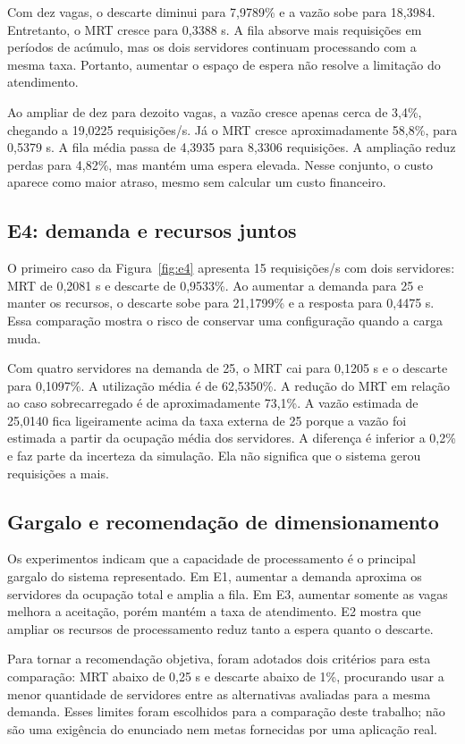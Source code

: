 \documentclass[10pt]{ieeeconf}
\begin{document}
Com dez vagas, o descarte diminui para 7,9789\% e a vazão sobe para 18,3984. Entretanto, o MRT cresce para 0,3388 s. A fila absorve mais requisições em períodos de acúmulo, mas os dois servidores continuam processando com a mesma taxa. Portanto, aumentar o espaço de espera não resolve a limitação do atendimento.

Ao ampliar de dez para dezoito vagas, a vazão cresce apenas cerca de 3,4\%, chegando a 19,0225 requisições/s. Já o MRT cresce aproximadamente 58,8\%, para 0,5379 s. A fila média passa de 4,3935 para 8,3306 requisições. A ampliação reduz perdas para 4,82\%, mas mantém uma espera elevada. Nesse conjunto, o custo aparece como maior atraso, mesmo sem calcular um custo financeiro.

\subsection{E4: demanda e recursos juntos}
O primeiro caso da Figura~\ref{fig:e4} apresenta 15 requisições/s com dois servidores: MRT de 0,2081 s e descarte de 0,9533\%. Ao aumentar a demanda para 25 e manter os recursos, o descarte sobe para 21,1799\% e a resposta para 0,4475 s. Essa comparação mostra o risco de conservar uma configuração quando a carga muda.

Com quatro servidores na demanda de 25, o MRT cai para 0,1205 s e o descarte para 0,1097\%. A utilização média é de 62,5350\%. A redução do MRT em relação ao caso sobrecarregado é de aproximadamente 73,1\%. A vazão estimada de 25,0140 fica ligeiramente acima da taxa externa de 25 porque a vazão foi estimada a partir da ocupação média dos servidores. A diferença é inferior a 0,2\% e faz parte da incerteza da simulação. Ela não significa que o sistema gerou requisições a mais.

\subsection{Gargalo e recomendação de dimensionamento}
Os experimentos indicam que a capacidade de processamento é o principal gargalo do sistema representado. Em E1, aumentar a demanda aproxima os servidores da ocupação total e amplia a fila. Em E3, aumentar somente as vagas melhora a aceitação, porém mantém a taxa de atendimento. E2 mostra que ampliar os recursos de processamento reduz tanto a espera quanto o descarte.

Para tornar a recomendação objetiva, foram adotados dois critérios para esta comparação: MRT abaixo de 0,25 s e descarte abaixo de 1\%, procurando usar a menor quantidade de servidores entre as alternativas avaliadas para a mesma demanda. Esses limites foram escolhidos para a comparação deste trabalho; não são uma exigência do enunciado nem metas fornecidas por uma aplicação real.
\end{document}
